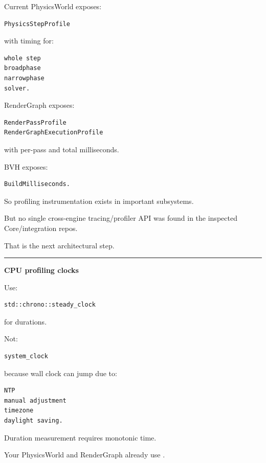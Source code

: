 Current PhysicsWorld exposes:

\begin{verbatim}
PhysicsStepProfile
\end{verbatim}

with timing for:

\begin{verbatim}
whole step
broadphase
narrowphase
solver.
\end{verbatim}

RenderGraph exposes:

\begin{verbatim}
RenderPassProfile
RenderGraphExecutionProfile
\end{verbatim}

with per-pass and total milliseconds.

BVH exposes:

\begin{verbatim}
BuildMilliseconds.
\end{verbatim}

So profiling instrumentation exists in important subsystems.

But no single cross-engine tracing/profiler API was found in the inspected Core/integration repos.

That is the next architectural step.

\begin{center}\rule{0.5\linewidth}{0.5pt}\end{center}

\textbf{CPU profiling clocks}

Use:

\begin{verbatim}
std::chrono::steady_clock
\end{verbatim}

for durations.

Not:

\begin{verbatim}
system_clock
\end{verbatim}

because wall clock can jump due to:

\begin{verbatim}
NTP
manual adjustment
timezone
daylight saving.
\end{verbatim}

Duration measurement requires monotonic time.

Your PhysicsWorld and RenderGraph already use .


